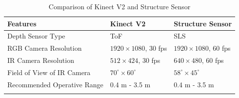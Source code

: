 \begin{table}[h]
\begin{tabular}{@{}lll@{}}
\toprule
\textbf{Features}                    & \textbf{Kinect V2}           & \textbf{Structure Sensor}         \\ \midrule
Depth Sensor Type           & ToF & SLS                 \\
RGB Camera Resolution       & $1920\times1080$, 30 fps & $1920\times1080$, 60 fps     \\
IR Camera Resolution        & $512\times424$, 30 fps   & $640\times480$, 60 fps                 \\ 
Field of View of IR Camera  & $70^\circ\times60^\circ$           & $58^\circ\times45^\circ$                         \\
Recommended Operative Range & 0.4 m - 3.5 m       & 0.4 m - 3.5 m                                  \\
           &                     & 
\end{tabular}
\caption{Comparison of Kinect V2 and Structure Sensor}
\label{table:KinectVsStructureSensor}
\end{table}

